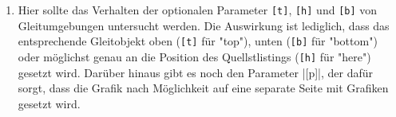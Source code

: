 \documentclass{scrartcl}
\begin{document}
\newsavebox{\SolutionCodeC}
\begin{lrbox}{\SolutionCodeC}
\begin{minipage}{\textwidth}
	\begin{enumerate}[label=\alph*)]\addtocounter{enumi}{2}

		\item Hier sollte das Verhalten der optionalen Parameter \verb+[t]+, \verb+[h]+ und \verb+[b]+ von Gleitumgebungen untersucht werden. Die Auswirkung ist lediglich, dass das entsprechende Gleitobjekt oben (\verb+[t]+ für "top"), unten (\verb+[b]+ für "bottom") oder möglichst genau an die Position des Quellstlistings (\verb+[h]+ für "here") gesetzt wird. Darüber hinaus gibt es noch den Parameter |[p]|, der dafür sorgt, dass die Grafik nach Möglichkeit auf eine separate Seite mit Grafiken gesetzt wird.

	\end{enumerate}
\end{minipage}
\end{lrbox}



\begin{solution}
\noindent\usebox\SolutionCodeA

\noindent\usebox\SolutionCodeB

\noindent\usebox\SolutionCodeC
\end{solution}


\clearpage
\end{document}
